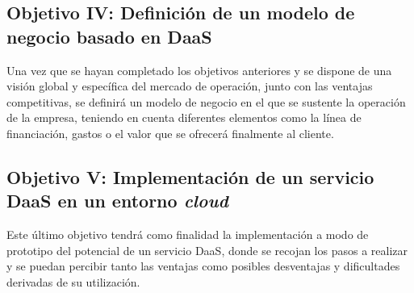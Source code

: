 \subsection{Objetivo IV: Definición de un modelo de negocio basado en \acs{DaaS}}
Una vez que se hayan completado los objetivos anteriores y se dispone de una visión global y específica del mercado de operación, junto con las ventajas competitivas, se definirá un modelo de negocio en el que se sustente la operación de la empresa, teniendo en cuenta diferentes elementos como la línea de financiación, gastos o el valor que se ofrecerá finalmente al cliente.

\subsection{Objetivo V: Implementación de un servicio \acs{DaaS} en un entorno \textit{cloud}}
Este último objetivo tendrá como finalidad la implementación a modo de prototipo del potencial de un servicio \acs{DaaS}, donde se recojan los pasos a realizar y se puedan percibir tanto las ventajas como posibles desventajas y dificultades derivadas de su utilización.


